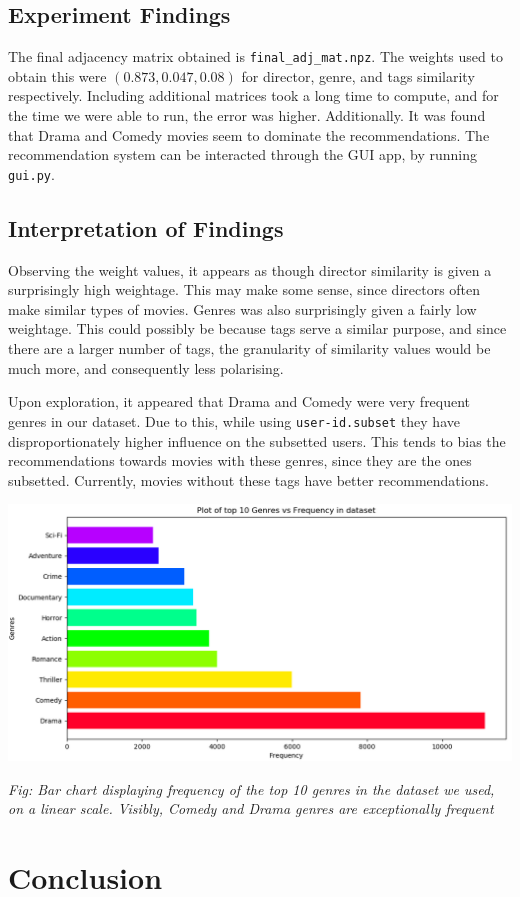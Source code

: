 \documentclass[11pt]{article}
\begin{document}
\hypertarget{experiment-findings}{%
\subsection{Experiment Findings}\label{experiment-findings}}

The final adjacency matrix obtained is \texttt{final\_adj\_mat.npz}. The
weights used to obtain this were \((0.873, 0.047, 0.08)\) for director,
genre, and tags similarity respectively. Including additional matrices
took a long time to compute, and for the time we were able to run, the
error was higher. Additionally. It was found that Drama and Comedy
movies seem to dominate the recommendations. The recommendation system
can be interacted through the GUI app, by running \texttt{gui.py}.

\hypertarget{interpretation-of-findings}{%
\subsection{Interpretation of
Findings}\label{interpretation-of-findings}}

Observing the weight values, it appears as though director similarity is
given a surprisingly high weightage. This may make some sense, since
directors often make similar types of movies. Genres was also
surprisingly given a fairly low weightage. This could possibly be
because tags serve a similar purpose, and since there are a larger
number of tags, the granularity of similarity values would be much more,
and consequently less polarising.

Upon exploration, it appeared that Drama and Comedy were very frequent
genres in our dataset. Due to this, while using \texttt{user-id.subset}
they have disproportionately higher influence on the subsetted users.
This tends to bias the recommendations towards movies with these genres,
since they are the ones subsetted. Currently, movies without these tags
have better recommendations.

\includegraphics[]{genre_count.png}
\begin{center}
    \textit{Fig: Bar chart displaying frequency of the top 10 genres in the dataset we used, on a linear scale. Visibly, Comedy and Drama genres are exceptionally frequent}
\end{center}
    \hypertarget{conclusion}{%
\section{Conclusion}\label{conclusion}}
\end{document}
